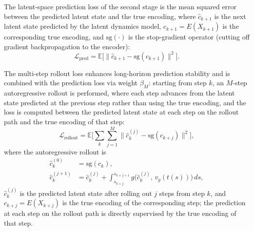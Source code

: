 The latent-space prediction loss of the second stage is the mean squared error between the predicted latent state and the true encoding, where $\hat{c}_{k+1}$ is the next latent state predicted by the latent dynamics model, $c_{k+1}=E(X_{k+1})$ is the corresponding true encoding, and $\mathrm{sg}(\cdot)$ is the stop-gradient operator (cutting off gradient backpropagation to the encoder):
\begin{equation}
\mathcal{L}_{\text{pred}}=\mathbb{E}\Big[\big\|\hat{c}_{k+1}-\mathrm{sg}(c_{k+1})\big\|^{2}\Big] .
\end{equation}

The multi-step rollout loss enhances long-horizon prediction stability and is combined with the prediction loss via weight $\beta_M$: starting from step $k$, an $M$-step autoregressive rollout is performed, where each step advances from the latent state predicted at the previous step rather than using the true encoding, and the loss is computed between the predicted latent state at each step on the rollout path and the true encoding of that step:
\begin{equation}
\mathcal{L}_{\text{rollout}}=\mathbb{E}\Big[\sum_{k}\sum_{j=1}^{M}\big\|\hat{c}_{k}^{(j)}-\mathrm{sg}(c_{k+j})\big\|^{2}\Big],
\end{equation}
where the autoregressive rollout is
\begin{equation}
\begin{aligned}
\hat{c}_{k}^{(0)} &= \mathrm{sg}(c_k), \\
\hat{c}_{k}^{(j+1)} &= \hat{c}_{k}^{(j)}+\int_{s_{k+j}}^{s_{k+j+1}} g\big(\hat{c}_{k}^{(j)},\,v_y(t(s))\big)\,ds ,
\end{aligned}
\end{equation}
$\hat{c}_{k}^{(j)}$ is the predicted latent state after rolling out $j$ steps from step $k$, and $c_{k+j}=E(X_{k+j})$ is the true encoding of the corresponding step; the prediction at each step on the rollout path is directly supervised by the true encoding of that step.
